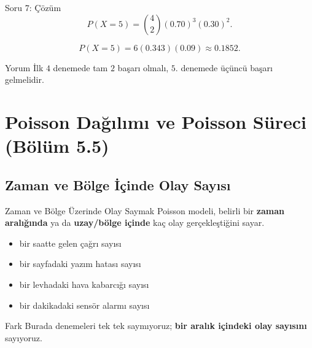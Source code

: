 \documentclass[light]{lutbeamer}
\begin{document}
\begin{frame}{Soru 7: Çözüm}
    \small
    \[
    P(X=5)=\binom{4}{2}(0.70)^3(0.30)^2.
    \]

    \[
    P(X=5)=6(0.343)(0.09)\approx 0.1852.
    \]

    \begin{exampleblock}{Yorum}
        İlk \(4\) denemede tam \(2\) başarı olmalı, \(5\). denemede üçüncü başarı gelmelidir.
    \end{exampleblock}
\end{frame}

\section{Poisson Dağılımı ve Poisson Süreci (Bölüm 5.5)}
\subsection{Zaman ve Bölge İçinde Olay Sayısı}

\begin{frame}{Zaman ve Bölge Üzerinde Olay Saymak}
    \small
    Poisson modeli, belirli bir \textbf{zaman aralığında} ya da \textbf{uzay/bölge içinde} kaç olay gerçekleştiğini sayar.

    \begin{itemize}
        \item bir saatte gelen çağrı sayısı
        \item bir sayfadaki yazım hatası sayısı
        \item bir levhadaki hava kabarcığı sayısı
        \item bir dakikadaki sensör alarmı sayısı
    \end{itemize}

    \begin{block}{Fark}
        Burada denemeleri tek tek saymıyoruz; \textbf{bir aralık içindeki olay sayısını} sayıyoruz.
    \end{block}
\end{frame}
\end{document}
